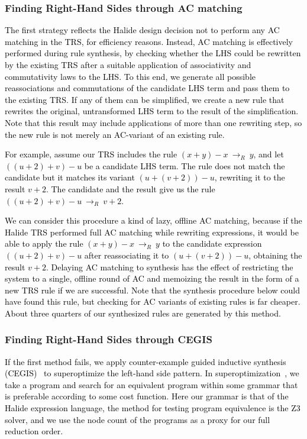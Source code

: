 \documentclass[acmsmall,review]{acmart}\settopmatter{printfolios=true,printccs=false,printacmref=false}
\newcommand{\modified}[1]{\textcolor{black}{{#1}}}
\newcommand{\rewrites}[0]{\:\rightarrow_{R}\:}
\begin{document}
\subsubsection{Finding Right-Hand Sides through AC matching}
\label{sec:rhsacmatching}
\modified{The first strategy reflects the Halide design decision not to perform any AC matching in the TRS, for efficiency reasons. 
Instead, AC matching is effectively performed during rule synthesis, by checking whether the LHS could be 
rewritten by the existing TRS after a suitable application of associativity and commutativity laws to the LHS. 
To this end, we generate all possible reassociations and commutations of the candidate LHS term and pass them to the existing TRS. 
If any of them can be simplified, we create a new rule that rewrites 
the original, untransformed LHS term to the result of the simplification.  Note that this result may include applications of more than one rewriting step, so the new rule is not merely an AC-variant of an existing rule. }

\modified{For example, assume our TRS includes the rule $(x + y) - x \rewrites y$, 
and let $((u + 2) + v) - u$ be a candidate LHS term. The rule does not match the candidate but it matches its variant $(u + (v + 2)) - u$, rewriting it to the result $v + 2$. The candidate and the result give us the rule $((u + 2) + v) - u \rewrites v + 2$. }

\modified{We can consider this procedure a kind of lazy, offline AC matching, because if the Halide TRS 
performed full AC matching while rewriting expressions, it would be able to apply the rule $(x + y) - x \rewrites  y$ to the candidate expression $((u + 2) + v) - u$ after reassociating it to $(u + (v + 2)) - u$, obtaining the result $v + 2$.  Delaying AC matching to synthesis has the effect of restricting the system to a single, offline round of AC and memoizing the result in the form of a new TRS rule if we are successful. 
Note that the synthesis procedure below could have found this rule, but checking for AC
variants of existing rules is far cheaper. About three quarters of our synthesized rules are generated by this method.}

\subsubsection{Finding Right-Hand Sides through CEGIS}
\label{sec:rhssynthesis}
\modified{If the first method fails, we apply counter-example guided inductive synthesis (CEGIS)~\cite{DBLP:conf/aplas/Solar-Lezama09} to superoptimize the left-hand side pattern.
In superoptimization~\cite{massalin1987superoptimizer}, we take a program and search 
for an equivalent program within some grammar that is preferable according 
to some cost function. Here our grammar is that of the Halide expression language, 
the method for testing program equivalence is the Z3 solver, and we use the node
count of the programs as a proxy for our full reduction order.}
\end{document}
